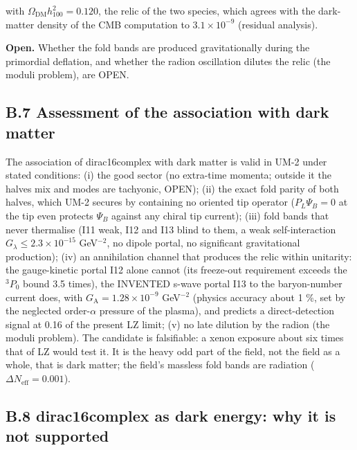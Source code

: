 \documentclass[
  10pt,
]{article}
\begin{document}
with \(\Omega_{\mathrm{DM}}h_{100}^2 = 0.120\), the relic of the two
species, which agrees with the dark-matter density of the CMB
computation to \(3.1\times10^{-9}\) (residual analysis).

\textbf{Open.} Whether the fold bands are produced gravitationally
during the primordial deflation, and whether the radion oscillation
dilutes the relic (the moduli problem), are OPEN.

\hypertarget{b.7-assessment-of-the-association-with-dark-matter}{%
\subsection*{B.7 Assessment of the association with dark
matter}\label{b.7-assessment-of-the-association-with-dark-matter}}

The association of dirac16complex with dark matter is valid in UM-2
under stated conditions: (i) the good sector (no extra-time momenta;
outside it the halves mix and modes are tachyonic, OPEN); (ii) the exact
fold parity of both halves, which UM-2 secures by containing no oriented
tip operator (\(P_L\Psi_B = 0\) at the tip even protects \(\Psi_B\)
against any chiral tip current); (iii) fold bands that never thermalise
(I11 weak, I12 and I13 blind to them, a weak self-interaction
\(G_\lambda \le 2.3\times10^{-15}\) GeV\(^{-2}\), no dipole portal, no
significant gravitational production); (iv) an annihilation channel that
produces the relic within unitarity: the gauge-kinetic portal I12 alone
cannot (its freeze-out requirement exceeds the \(^3P_0\) bound 3.5
times), the INVENTED s-wave portal I13 to the baryon-number current
does, with \(G_{\mathrm{A}} = 1.28\times10^{-9}\) GeV\(^{-2}\) (physics
accuracy about 1 \%, set by the neglected order-\(\alpha\) pressure of
the plasma), and predicts a direct-detection signal at 0.16 of the
present LZ limit; (v) no late dilution by the radion (the moduli
problem). The candidate is falsifiable: a xenon exposure about six times
that of LZ would test it. It is the heavy odd part of the field, not the
field as a whole, that is dark matter; the field's massless fold bands
are radiation (\(\Delta N_{\mathrm{eff}} = 0.001\)).

\hypertarget{b.8-dirac16complex-as-dark-energy-why-it-is-not-supported}{%
\subsection*{B.8 dirac16complex as dark energy: why it is not
supported}\label{b.8-dirac16complex-as-dark-energy-why-it-is-not-supported}}
\end{document}
